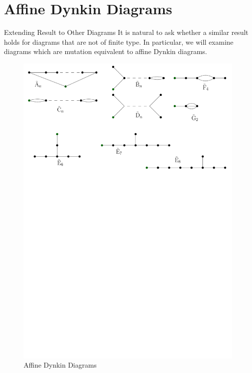 \documentclass{beamer}
\begin{document}
\section{Affine Dynkin Diagrams}
\begin{frame}{Extending Result to Other Diagrams}
It is natural to ask whether a similar result holds for diagrams that are not of finite type. In particular, we will examine diagrams which are mutation equivalent to affine Dynkin diagrams.
\begin{figure}
\includegraphics[scale = .50]{Affine-Diagrams.pdf}
\caption{Affine Dynkin Diagrams}
\end{figure}
\end{frame}
\end{document}
